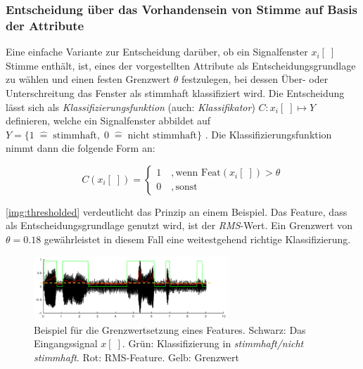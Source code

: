 \subsubsection{Entscheidung über das Vorhandensein von Stimme auf Basis der Attribute}

Eine einfache Variante zur Entscheidung darüber, ob ein Signalfenster $x_i[\;]$ Stimme enthält, ist, eines der vorgestellten Attribute als Entscheidungsgrundlage zu wählen und einen festen Grenzwert $\theta$ festzulegen, bei dessen Über- oder Unterschreitung das Fenster als stimmhaft klassifiziert wird. Die Entscheidung lässt sich als \emph{Klassifizierungsfunktion} (auch: \emph{Klassifikator}) $C: x_i[\;] \mapsto Y$ definieren, welche ein Signalfenster abbildet auf $Y = \{ 1 \; \hat{=} \; \text{stimmhaft}, \; 0 \; \hat{=} \; \text{nicht stimmhaft}\}$ . Die Klassifizierungsfunktion nimmt dann die folgende Form an:

\begin{equation}
	C(x_i[\;]) = 
\begin{cases}
1 \quad , \text{wenn Feat}(x_i[\;]) > \theta \\
0 \quad , \text{sonst}
 \end{cases}
\end{equation}

\autoref{img:thresholded} verdeutlicht das Prinzip an einem Beispiel. Das Feature, dass als Entscheidungsgrundlage genutzt wird, ist der \emph{RMS}-Wert. Ein Grenzwert von $\theta = 0.18$ gewährleistet in diesem Fall eine weitestgehend richtige Klassifizierung.

\begin{figure}[h]
	\centering
	\includegraphics[width=0.65\textwidth]{bilder/thresholded02.png}
	\caption[Beispiel für die Grenzwertsetzung eines Features]{Beispiel für die Grenzwertsetzung eines Features. Schwarz: Das Eingangssignal $x[\;]$. Grün: Klassifizierung in \emph{stimmhaft/nicht stimmhaft}. Rot: RMS-Feature. Gelb: Grenzwert}
	\label{img:thresholded}
\end{figure}


